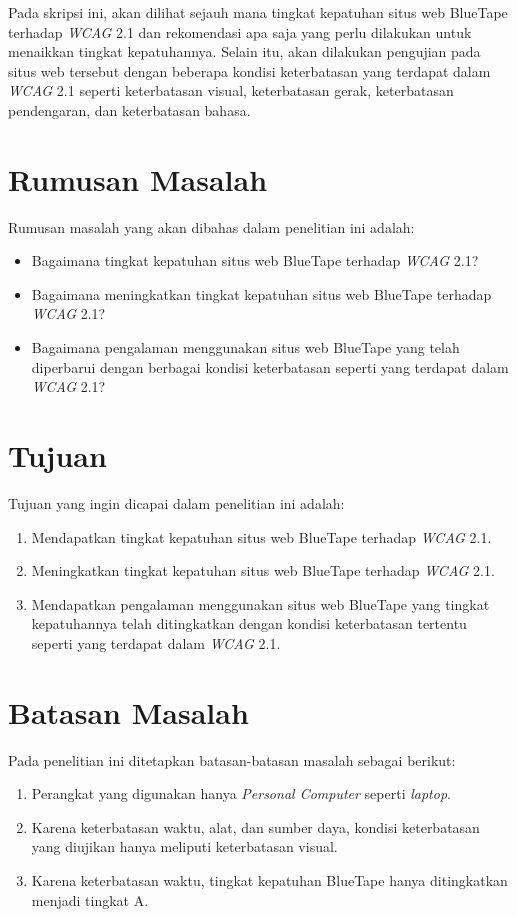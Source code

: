 Pada skripsi ini, akan dilihat sejauh mana tingkat kepatuhan situs web BlueTape terhadap \textit{WCAG} 2.1 dan rekomendasi apa saja yang perlu dilakukan untuk menaikkan tingkat kepatuhannya. Selain itu, akan dilakukan pengujian pada situs web tersebut dengan beberapa kondisi keterbatasan yang terdapat dalam \textit{WCAG} 2.1 seperti keterbatasan visual, keterbatasan gerak, keterbatasan pendengaran, dan keterbatasan bahasa.

\section{Rumusan Masalah}
\label{sec:rumusan}
Rumusan masalah yang akan dibahas dalam penelitian ini adalah: 
\begin{itemize}
	\item Bagaimana tingkat kepatuhan situs web BlueTape terhadap \textit{WCAG} 2.1?
	\item Bagaimana meningkatkan tingkat kepatuhan situs web BlueTape terhadap \textit{WCAG} 2.1?  
	\item Bagaimana pengalaman menggunakan situs web BlueTape yang telah diperbarui dengan berbagai kondisi keterbatasan seperti yang terdapat dalam \textit{WCAG} 2.1?
\end{itemize}

\section{Tujuan}
\label{sec:tujuan}
Tujuan yang ingin dicapai dalam penelitian ini adalah:
\begin{enumerate}
	\item Mendapatkan tingkat kepatuhan situs web BlueTape terhadap \textit{WCAG} 2.1.
	\item Meningkatkan tingkat kepatuhan situs web BlueTape terhadap \textit{WCAG} 2.1.
	\item Mendapatkan pengalaman menggunakan situs web BlueTape yang tingkat kepatuhannya telah ditingkatkan dengan kondisi keterbatasan tertentu seperti yang terdapat dalam \textit{WCAG} 2.1.
\end{enumerate}

\section{Batasan Masalah}
\label{sec:batasan}
Pada penelitian ini ditetapkan batasan-batasan masalah sebagai berikut:
\begin{enumerate}
	\item Perangkat yang digunakan hanya \textit{Personal Computer} seperti \textit{laptop}.
	\item Karena keterbatasan waktu, alat, dan sumber daya, kondisi keterbatasan yang diujikan hanya meliputi keterbatasan visual.
	\item Karena keterbatasan waktu, tingkat kepatuhan BlueTape hanya ditingkatkan menjadi tingkat A.
\end{enumerate}


